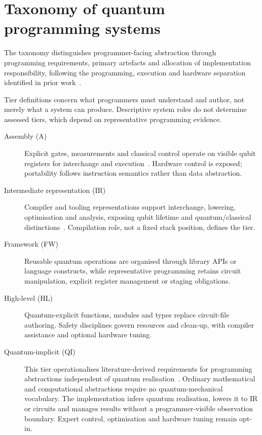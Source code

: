 \section{Taxonomy of quantum programming systems}\label{sec:taxonomy}
The taxonomy distinguishes programmer-facing abstraction through programming requirements, primary artefacts and allocation of implementation responsibility, following the programming, execution and hardware separation identified in prior work~\cite{DiMatteo2024AbstractionHierarchy}.

Tier definitions concern what programmers must understand and author, not merely what a system can produce.
Descriptive system roles do not determine assessed tiers, which depend on representative programming evidence.

\begin{description}
    \item[Assembly (A)]
    Explicit gates, measurements and classical control operate on visible qubit registers for interchange and execution~\cite{cross2022openqasm3}.
    Hardware control is exposed; portability follows instruction semantics rather than data abstraction.

    \item[Intermediate representation (IR)]
    Compiler and tooling representations support interchange, lowering, optimisation and analysis, exposing qubit lifetime and quantum/classical distinctions~\cite{qir_alliance_qir_spec_repo,McCaskey2021MLIRDialectQASM}.
    Compilation role, not a fixed stack position, defines the tier.

    \item[Framework (FW)]
    Reusable quantum operations are organised through library APIs or language constructs, while representative programming retains circuit manipulation, explicit register management or staging obligations.

    \item[High-level (HL)]
    Quantum-explicit functions, modules and types replace circuit-file authoring.
    Safety disciplines govern resources and clean-up, with compiler assistance and optional hardware tuning.

    \item[Quantum-implicit (QI)]
    This tier operationalises literature-derived requirements for programming abstractions independent of quantum realisation~\cite{nunez_corrales2025betterabstractmachines}.
    Ordinary mathematical and computational abstractions require no quantum-mechanical vocabulary.
    The implementation infers quantum realisation, lowers it to IR or circuits and manages results without a programmer-visible observation boundary.
    Expert control, optimisation and hardware tuning remain opt-in.
\end{description}


